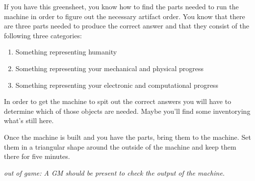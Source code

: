 \documentclass[green]{guildcamp3}
\begin{document}
\name{\gAddPartsTech{}}

If you have this greensheet, you know how to find the parts needed to run the machine in order to figure out the necessary artifact order. You know that there are three parts needed to produce the correct answer and that they consist of the following three categories:

\begin{enumerate}
	\item Something representing humanity
	\item Something representing your mechanical and physical progress
	\item Something representing your electronic and computational progress
\end{enumerate}

In order to get the machine to spit out the correct answers you will have to determine which of those objects are needed. Maybe you'll find some inventorying what's still here. 

Once the machine is built and you have the parts, bring them to the machine. Set them in a triangular shape around the outside of the machine and keep them there for five minutes. 

\emph{out of game: A GM should be present to check the output of the machine.}

\end{document}

